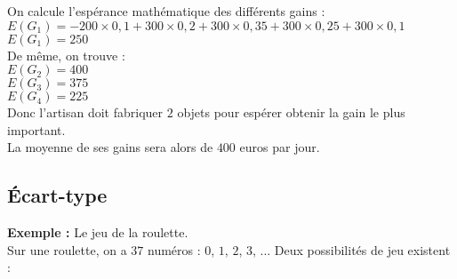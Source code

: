 \vspace*{.3cm}

On calcule l'espérance mathématique des différents gains : \\

$E(G_1) = -200 \times 0,1 + 300 \times 0,2 + 300 \times 0,35 + 300 \times 0,25 + 300 \times 0,1$ \\
$E(G_1) = 250$ \\

De même, on trouve : \\ 

$E(G_2) = 400$ \\

$E(G_3) = 375$ \\

$E(G_4) = 225$ \\

Donc l'artisan doit fabriquer $2$ objets pour espérer obtenir la gain le plus important. \\ La moyenne de ses gains sera alors de $400$ euros par jour.

\newpage

\vspace*{-1.5cm}

\subsection{Écart-type}

\vspace*{.2cm}

\textbf{Exemple :} Le jeu de la roulette. \\

Sur une roulette, on a $37$ numéros : $0$, $1$, $2$, $3$, ... Deux possibilités de jeu existent : \\

